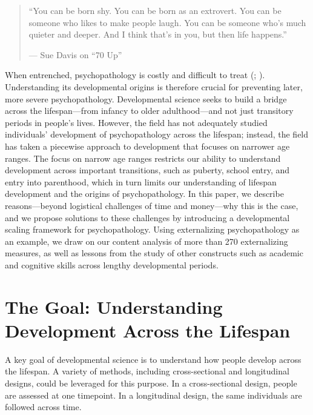 \documentclass[
  american,
  letterpaper,
  12pt]{article}
\newenvironment{apaquoteattribution}
  {\par\raggedleft\setlength{\parindent}{0pt}}
  {\par}
\begin{document}
\begin{quote}
``You can be born shy. You can be born as an extrovert. You can be
someone who likes to make people laugh. You can be someone who's much
quieter and deeper. And I think that's in you, but then life happens.''

\begin{apaquoteattribution}

--- Sue Davis on ``70 Up''

\end{apaquoteattribution}
\end{quote}

When entrenched, psychopathology is costly and difficult to treat
(;
). Understanding its
developmental origins is therefore crucial for preventing later, more
severe psychopathology. Developmental science seeks to build a bridge
across the lifespan---from infancy to older adulthood---and not just
transitory periods in people's lives. However, the field has not
adequately studied individuals' development of psychopathology across
the lifespan; instead, the field has taken a piecewise approach to
development that focuses on narrower age ranges. The focus on narrow age
ranges restricts our ability to understand development across important
transitions, such as puberty, school entry, and entry into parenthood,
which in turn limits our understanding of lifespan development and the
origins of psychopathology. In this paper, we describe reasons---beyond
logistical challenges of time and money---why this is the case, and we
propose solutions to these challenges by introducing a developmental
scaling framework for psychopathology. Using externalizing
psychopathology as an example, we draw on our content analysis of more
than 270 externalizing measures, as well as lessons from the study of
other constructs such as academic and cognitive skills across lengthy
developmental periods.

\section{The Goal: Understanding Development Across the
Lifespan}\label{the-goal-understanding-development-across-the-lifespan}

A key goal of developmental science is to understand how people develop
across the lifespan. A variety of methods, including cross-sectional and
longitudinal designs, could be leveraged for this purpose. In a
cross-sectional design, people are assessed at one timepoint. In a
longitudinal design, the same individuals are followed across time.
\end{document}
